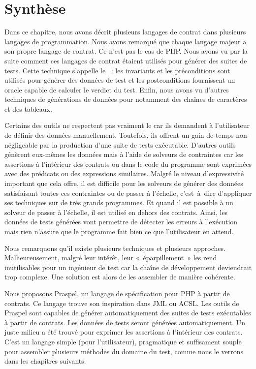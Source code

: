 \section{Synthèse}
\label{section:sota:summary}

Dans ce chapitre, nous avons décrit plusieurs langages de contrat dans plusieurs
langages de programmation. Nous avons remarqué que chaque langage majeur a son
propre langage de contrat. Ce n'est pas le cas de PHP. Nous avons vu par la
suite comment ces langages de contrat étaient utilisés pour générer des suites
de tests. Cette technique s'appelle le ~: les
invariants et les préconditions sont utilisés pour générer des données de test
et les postconditions fournissent un oracle capable de calculer le verdict du
test. Enfin, nous avons vu d'autres techniques de générations de données pour
notamment des chaînes de caractères et des tableaux.

Certains des outils ne respectent pas vraiment le  car ils demandent à l'utilisateur de définir des données manuellement.
Toutefois, ils offrent un gain de temps non-négligeable par la production d'une
suite de tests exécutable. D'autres outils génèrent eux-mêmes les données mais à
l'aide de solveurs de contraintes car les assertions à l'intérieur des contrats
ou dans le code du programme sont exprimées avec des prédicats ou des
expressions similaires. Malgré le niveau d'expressivité important que cela
offre, il est difficile pour les solveurs de générer des données satisfaisant
toutes ces contraintes ou de passer à l'échelle, c'est~à~dire d'appliquer ses
techniques sur de très grands programmes. Et quand il est possible à un solveur
de passer à l'échelle, il est utilisé en dehors des contrats. Ainsi, les données
de tests générées vont permettre de détecter les erreurs à l'exécution mais rien
n'assure que le programme fait bien ce que l'utilisateur en attend.

Nous remarquons qu'il existe plusieurs techniques et plusieurs approches.
Malheureusement, malgré leur intérêt, leur «~éparpillement~» les rend
inutilisables pour un ingénieur de test car la chaîne de développement
deviendrait trop complexe. Une solution est alors de les assembler de manière
cohérente.

Nous proposons Praspel, un langage de spécification pour PHP à partir de
contrats. Ce langage trouve son inspiration dans JML ou ACSL. Les outils de
Praspel sont capables de générer automatiquement des suites de tests exécutables
à partir de contrats. Les données de tests seront générées automatiquement. Un
juste milieu a été trouvé pour exprimer les assertions à l'intérieur des
contrats. C'est un langage simple (pour l'utilisateur), pragmatique et
suffisament souple pour assembler plusieurs méthodes du domaine du test, comme
nous le verrons dans les chapitres suivants.
